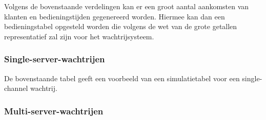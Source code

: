 \documentclass{article}
\begin{document}
	Volgens de bovenstaande verdelingen kan er een groot aantal aankomsten van klanten en bedieningstijden gegenereerd worden. Hiermee kan dan een bedieningstabel opgesteld worden die volgens de wet van de grote getallen representatief zal zijn voor het wachtrijsysteem.

	\subsubsection{Single-server-wachtrijen}
	\begin{table}[!ht]
	
		\end{table}
	
	De bovenstaande tabel geeft een voorbeeld van een simulatietabel voor een single-channel wachtrij.
	
	\subsubsection{Multi-server-wachtrijen}
	
\end{document}
